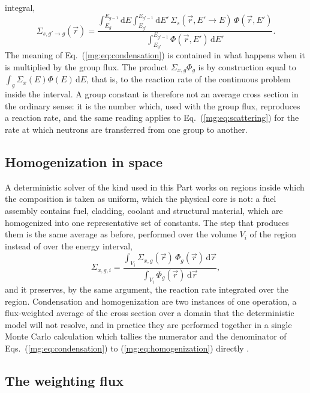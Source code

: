integral,
%
\begin{equation}
  \Sigma_{s,g'\to g}(\vec{r}) =
  \frac{\displaystyle\int_{E_g}^{E_{g-1}}\!\!\mathrm{d}E
        \int_{E_{g'}}^{E_{g'-1}}\!\!\mathrm{d}E'\,
        \Sigma_s(\vec{r},E'\!\to\!E)\,\Phi(\vec{r},E')}
       {\displaystyle\int_{E_{g'}}^{E_{g'-1}}\Phi(\vec{r},E')\,\mathrm{d}E'} .
  \label{mg:eq:scattering}
\end{equation}
%
The meaning of Eq.~(\ref{mg:eq:condensation}) is contained in what happens when
it is multiplied by the group flux. The product $\Sigma_{x,g}\Phi_g$ is by
construction equal to $\int_g \Sigma_x(E)\Phi(E)\,\mathrm{d}E$, that is, to the
reaction rate of the continuous problem inside the interval. A group constant is
therefore not an average cross section in the ordinary sense: it is the number
which, used with the group flux, reproduces a reaction rate, and the same
reading applies to Eq.~(\ref{mg:eq:scattering}) for the rate at which neutrons
are transferred from one group to another.

\subsection{Homogenization in space}

A deterministic solver of the kind used in this Part works on regions inside
which the composition is taken as uniform, which the physical core is not: a
fuel assembly contains fuel, cladding, coolant and structural material, which
are homogenized into one representative set of constants. The step that produces
them is the same average as before, performed over the volume $V_i$ of the
region instead of over the energy interval,
%
\begin{equation}
  \Sigma_{x,g,i} =
  \frac{\displaystyle\int_{V_i}\Sigma_{x,g}(\vec{r})\,\Phi_g(\vec{r})\,\mathrm{d}\vec{r}}
       {\displaystyle\int_{V_i}\Phi_g(\vec{r})\,\mathrm{d}\vec{r}} ,
  \label{mg:eq:homogenization}
\end{equation}
%
and it preserves, by the same argument, the reaction rate integrated over the
region. Condensation and homogenization are two instances of one operation, a
flux-weighted average of the cross section over a domain that the deterministic
model will not resolve, and in practice they are performed together in a single
Monte Carlo calculation which tallies the numerator and the denominator of
Eqs.~(\ref{mg:eq:condensation}) to (\ref{mg:eq:homogenization}) directly
\cite{Serpent_homog_technique}.

\subsection{The weighting flux}


